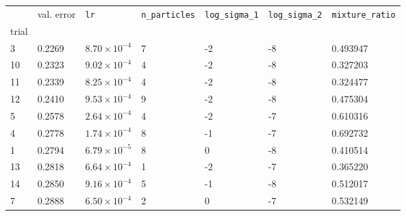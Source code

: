 \begin{tabular}{lp{2.3cm}p{2.3cm}p{2.3cm}p{2.3cm}p{2.3cm}p{2.3cm}}
\toprule
{} &  val. error &         \texttt{lr} &  \texttt{n\_particles} &  \texttt{log\_sigma\_1} &  \texttt{log\_sigma\_2} &  \texttt{mixture\_ratio} \\
trial &             &                     &                        &                         &                         &                          \\
\midrule
3     &      0.2269 & $8.70\times10^{-4}$ &                      7 &                      -2 &                      -8 &                 0.493947 \\
10    &      0.2323 & $9.02\times10^{-4}$ &                      4 &                      -2 &                      -8 &                 0.327203 \\
11    &      0.2339 & $8.25\times10^{-4}$ &                      4 &                      -2 &                      -8 &                 0.324477 \\
12    &      0.2410 & $9.53\times10^{-4}$ &                      9 &                      -2 &                      -8 &                 0.475304 \\
5     &      0.2578 & $2.64\times10^{-4}$ &                      4 &                      -2 &                      -7 &                 0.610316 \\
4     &      0.2778 & $1.74\times10^{-4}$ &                      8 &                      -1 &                      -7 &                 0.692732 \\
1     &      0.2794 & $6.79\times10^{-5}$ &                      8 &                       0 &                      -8 &                 0.410514 \\
13    &      0.2818 & $6.64\times10^{-4}$ &                      1 &                      -2 &                      -7 &                 0.365220 \\
14    &      0.2850 & $9.16\times10^{-4}$ &                      5 &                      -1 &                      -8 &                 0.512017 \\
7     &      0.2888 & $6.50\times10^{-4}$ &                      2 &                       0 &                      -7 &                 0.532149 \\
\bottomrule
\end{tabular}
